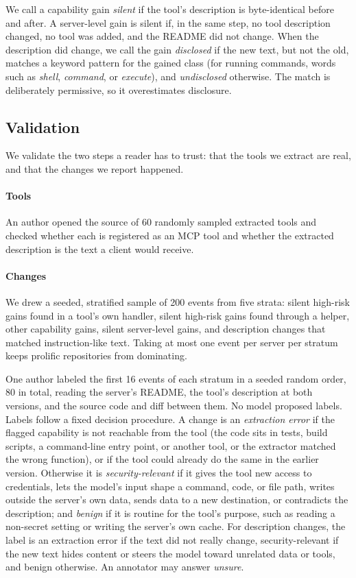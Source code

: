 We call a capability gain \emph{silent} if the tool's description is byte-identical before and after. A server-level gain is silent if, in the same step, no tool description changed, no tool was added, and the README did not change. When the description did change, we call the gain \emph{disclosed} if the new text, but not the old, matches a keyword pattern for the gained class (for running commands, words such as \emph{shell}, \emph{command}, or \emph{execute}), and \emph{undisclosed} otherwise. The match is deliberately permissive, so it overestimates disclosure.

\subsection{Validation}\label{sec:validation}
We validate the two steps a reader has to trust: that the tools we extract are real, and that the changes we report happened.

\paragraph{Tools}
An author opened the source of 60 randomly sampled extracted tools and checked whether each is registered as an MCP tool and whether the extracted description is the text a client would receive.

\paragraph{Changes}
We drew a seeded, stratified sample of 200 events from five strata: silent high-risk gains found in a tool's own handler, silent high-risk gains found through a helper, other capability gains, silent server-level gains, and description changes that matched instruction-like text. Taking at most one event per server per stratum keeps prolific repositories from dominating.

One author labeled the first 16 events of each stratum in a seeded random order, 80 in total, reading the server's README, the tool's description at both versions, and the source code and diff between them. No model proposed labels. Labels follow a fixed decision procedure. A change is an \emph{extraction error} if the flagged capability is not reachable from the tool (the code sits in tests, build scripts, a command-line entry point, or another tool, or the extractor matched the wrong function), or if the tool could already do the same in the earlier version. Otherwise it is \emph{security-relevant} if it gives the tool new access to credentials, lets the model's input shape a command, code, or file path, writes outside the server's own data, sends data to a new destination, or contradicts the description; and \emph{benign} if it is routine for the tool's purpose, such as reading a non-secret setting or writing the server's own cache. For description changes, the label is an extraction error if the text did not really change, security-relevant if the new text hides content or steers the model toward unrelated data or tools, and benign otherwise. An annotator may answer \emph{unsure}.

